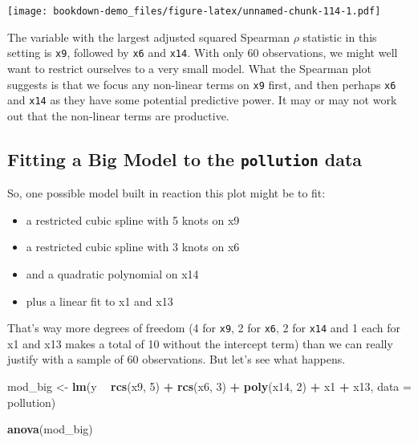 \documentclass[]{book}
\newenvironment{Shaded}{\begin{snugshade}}{\end{snugshade}}
\newcommand{\KeywordTok}[1]{\textcolor[rgb]{0.13,0.29,0.53}{\textbf{#1}}}
\newcommand{\DataTypeTok}[1]{\textcolor[rgb]{0.13,0.29,0.53}{#1}}
\newcommand{\DecValTok}[1]{\textcolor[rgb]{0.00,0.00,0.81}{#1}}
\newcommand{\StringTok}[1]{\textcolor[rgb]{0.31,0.60,0.02}{#1}}
\newcommand{\OperatorTok}[1]{\textcolor[rgb]{0.81,0.36,0.00}{\textbf{#1}}}
\newcommand{\NormalTok}[1]{#1}
\providecommand{\tightlist}{%
  \setlength{\itemsep}{0pt}\setlength{\parskip}{0pt}}
\theoremstyle{definition}
\theoremstyle{definition}
\theoremstyle{definition}
\theoremstyle{remark}
\begin{document}
\texttt{[image: bookdown-demo\_files/figure-latex/unnamed-chunk-114-1.pdf]}

The variable with the largest adjusted squared Spearman \(\rho\)
statistic in this setting is \texttt{x9}, followed by \texttt{x6} and
\texttt{x14}. With only 60 observations, we might well want to restrict
ourselves to a very small model. What the Spearman plot suggests is that
we focus any non-linear terms on \texttt{x9} first, and then perhaps
\texttt{x6} and \texttt{x14} as they have some potential predictive
power. It may or may not work out that the non-linear terms are
productive.

\subsection{\texorpdfstring{Fitting a Big Model to the
\texttt{pollution}
data}{Fitting a Big Model to the pollution data}}\label{fitting-a-big-model-to-the-pollution-data}

So, one possible model built in reaction this plot might be to fit:

\begin{itemize}
\tightlist
\item
  a restricted cubic spline with 5 knots on x9
\item
  a restricted cubic spline with 3 knots on x6
\item
  and a quadratic polynomial on x14
\item
  plus a linear fit to x1 and x13
\end{itemize}

That's way more degrees of freedom (4 for \texttt{x9}, 2 for
\texttt{x6}, 2 for \texttt{x14} and 1 each for x1 and x13 makes a total
of 10 without the intercept term) than we can really justify with a
sample of 60 observations. But let's see what happens.

\begin{Shaded}
\begin{Highlighting}[]
\NormalTok{mod_big <-}\StringTok{ }\KeywordTok{lm}\NormalTok{(y }\OperatorTok{~}\StringTok{ }\KeywordTok{rcs}\NormalTok{(x9, }\DecValTok{5}\NormalTok{) }\OperatorTok{+}\StringTok{ }\KeywordTok{rcs}\NormalTok{(x6, }\DecValTok{3}\NormalTok{) }\OperatorTok{+}\StringTok{ }\KeywordTok{poly}\NormalTok{(x14, }\DecValTok{2}\NormalTok{) }\OperatorTok{+}\StringTok{ }\NormalTok{x1 }\OperatorTok{+}\StringTok{ }\NormalTok{x13, }\DataTypeTok{data =}\NormalTok{ pollution)}

\KeywordTok{anova}\NormalTok{(mod_big)}
\end{Highlighting}
\end{Shaded}
\end{document}
